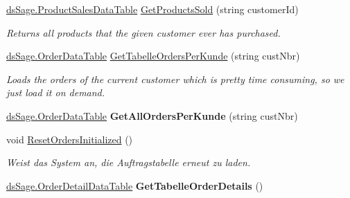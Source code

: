 \begin{DoxyCompactItemize}
\item 
\hyperlink{class_products_1_1_data_1_1ds_sage_1_1_product_sales_data_table}{ds\+Sage.\+Product\+Sales\+Data\+Table} \hyperlink{class_products_1_1_data_1_1_data_service_afc622f4767b82db4f1572ff2b7b9eee9}{Get\+Products\+Sold} (string customer\+Id)
\begin{DoxyCompactList}\small\item\em Returns all products that the given customer ever has purchased. \end{DoxyCompactList}\item 
\hyperlink{class_products_1_1_data_1_1ds_sage_1_1_order_data_table}{ds\+Sage.\+Order\+Data\+Table} \hyperlink{class_products_1_1_data_1_1_data_service_ab1f77d2060a082e4c941bf4f4e9e8b6f}{Get\+Tabelle\+Orders\+Per\+Kunde} (string cust\+Nbr)
\begin{DoxyCompactList}\small\item\em Loads the orders of the current customer which is pretty time consuming, so we just load it on demand. \end{DoxyCompactList}\item 
\hyperlink{class_products_1_1_data_1_1ds_sage_1_1_order_data_table}{ds\+Sage.\+Order\+Data\+Table} {\bfseries Get\+All\+Orders\+Per\+Kunde} (string cust\+Nbr)\hypertarget{class_products_1_1_data_1_1_data_service_ab1f29caf6585c2ea6987192c14eee425}{}\label{class_products_1_1_data_1_1_data_service_ab1f29caf6585c2ea6987192c14eee425}

\item 
void \hyperlink{class_products_1_1_data_1_1_data_service_a0c4fb180c545d665602a4429c3b7ae59}{Reset\+Orders\+Initialized} ()
\begin{DoxyCompactList}\small\item\em Weist das System an, die Auftragstabelle erneut zu laden. \end{DoxyCompactList}\item 
\hyperlink{class_products_1_1_data_1_1ds_sage_1_1_order_detail_data_table}{ds\+Sage.\+Order\+Detail\+Data\+Table} {\bfseries Get\+Tabelle\+Order\+Details} ()\hypertarget{class_products_1_1_data_1_1_data_service_a519894c4bf793fa32f876abb1cd1b5ae}{}\label{class_products_1_1_data_1_1_data_service_a519894c4bf793fa32f876abb1cd1b5ae}


\end{DoxyCompactItemize}
